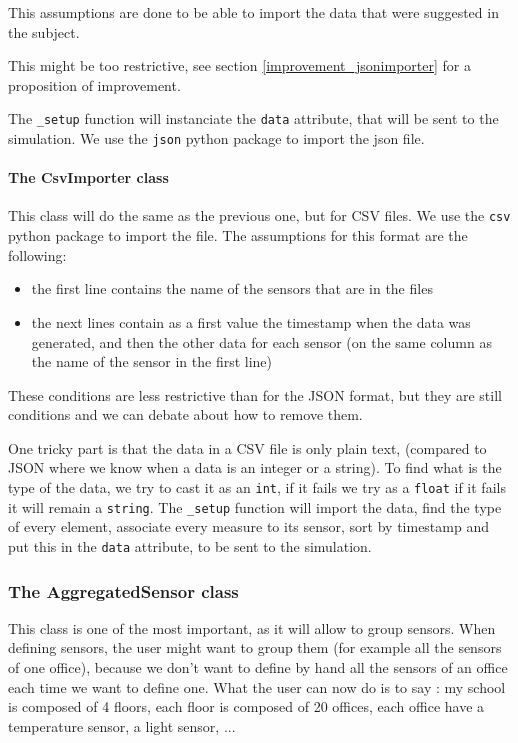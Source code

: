 This assumptions are done to be able to import the data that were suggested in the subject.

This might be too restrictive, see section \ref{improvement_jsonimporter} for a proposition of improvement.

The \verb!_setup! function will instanciate the \verb!data! attribute, that will be sent to the simulation. We use the \verb!json! python package to import the json file.

\paragraph{The CsvImporter class}

This class will do the same as the previous one, but for CSV files. We use the \verb!csv! python package to import the file. The assumptions for this format are the following:
\begin{itemize}
\item the first line contains the name of the sensors that are in the files
\item the next lines contain as a first value the timestamp when the data was generated, and then the other data for each sensor (on the same column as the name of the sensor in the first line)
\end{itemize}

These conditions are less restrictive than for the JSON format, but they are still conditions and we can debate about how to remove them.

One tricky part is that the data in a CSV file is only plain text, (compared to JSON where we know when a data is an integer or a string). To find what is the type of the data, we try to cast it as an \verb!int!, if it fails we try as a \verb!float! if it fails it will remain a \verb!string!. The \verb!_setup! function will import the data, find the type of every element, associate every measure to its sensor, sort by timestamp and put this in the \verb!data! attribute, to be sent to the simulation.



\subsubsection{The AggregatedSensor class}

This class is one of the most important, as it will allow to group sensors. When defining sensors, the user might want to group them (for example all the sensors of one office), because we don't want to define by hand all the sensors of an office each time we want to define one. What the user can now do is to say : my school is composed of 4 floors, each floor is composed of 20 offices, each office have a temperature sensor, a light sensor, ...

